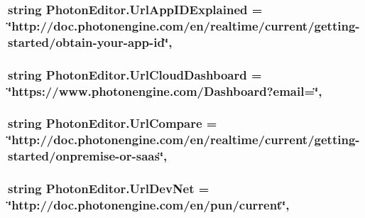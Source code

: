 \subsubsection[{\texorpdfstring{Url\+App\+I\+D\+Explained}{UrlAppIDExplained}}]{\setlength{\rightskip}{0pt plus 5cm}string Photon\+Editor.\+Url\+App\+I\+D\+Explained = \char`\"{}http\+://doc.\+photonengine.\+com/en/realtime/current/getting-\/started/obtain-\/your-\/app-\/id\char`\"{}\hspace{0.3cm}{\ttfamily [static]}, {\ttfamily [protected]}}\hypertarget{class_photon_editor_a684e57a183bbf8bbbe2bf9ea7520d8d2}{}\label{class_photon_editor_a684e57a183bbf8bbbe2bf9ea7520d8d2}
\subsubsection[{\texorpdfstring{Url\+Cloud\+Dashboard}{UrlCloudDashboard}}]{\setlength{\rightskip}{0pt plus 5cm}string Photon\+Editor.\+Url\+Cloud\+Dashboard = \char`\"{}https\+://www.\+photonengine.\+com/Dashboard?email=\char`\"{}\hspace{0.3cm}{\ttfamily [static]}, {\ttfamily [protected]}}\hypertarget{class_photon_editor_a9914d20ee113bbc862c10076770f68bf}{}\label{class_photon_editor_a9914d20ee113bbc862c10076770f68bf}
\subsubsection[{\texorpdfstring{Url\+Compare}{UrlCompare}}]{\setlength{\rightskip}{0pt plus 5cm}string Photon\+Editor.\+Url\+Compare = \char`\"{}http\+://doc.\+photonengine.\+com/en/realtime/current/getting-\/started/onpremise-\/or-\/saas\char`\"{}\hspace{0.3cm}{\ttfamily [static]}, {\ttfamily [protected]}}\hypertarget{class_photon_editor_a6c16a7bf3978e7afaf4ca8ffbe12ce8b}{}\label{class_photon_editor_a6c16a7bf3978e7afaf4ca8ffbe12ce8b}
\subsubsection[{\texorpdfstring{Url\+Dev\+Net}{UrlDevNet}}]{\setlength{\rightskip}{0pt plus 5cm}string Photon\+Editor.\+Url\+Dev\+Net = \char`\"{}http\+://doc.\+photonengine.\+com/en/pun/current\char`\"{}\hspace{0.3cm}{\ttfamily [static]}, {\ttfamily [protected]}}\hypertarget{class_photon_editor_abdf6a9fa996d1f5d8ada5a4bc234a3b9}{}\label{class_photon_editor_abdf6a9fa996d1f5d8ada5a4bc234a3b9}
